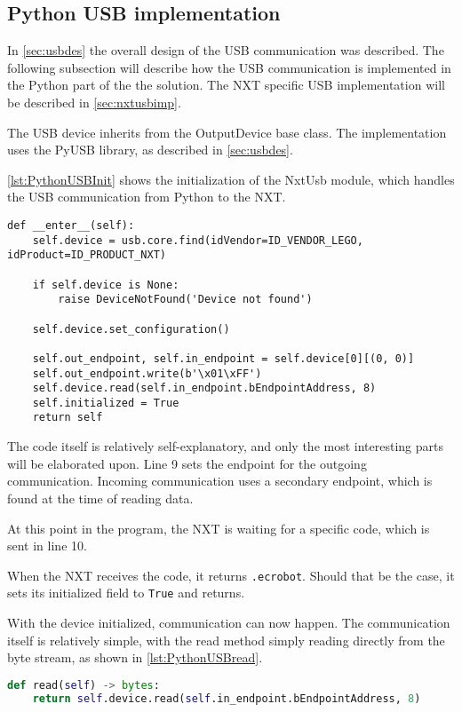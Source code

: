 \subsection{Python USB implementation}\label{sol:subsec:pythonusb}
In \autoref{sec:usbdes} the overall design of the USB communication was described.
The following subsection will describe how the USB communication is implemented in the Python part of the the solution.
The NXT specific USB implementation will be described in \autoref{sec:nxtusbimp}.

The USB device inherits from the OutputDevice base class.
The implementation uses the PyUSB library, as described in \autoref{sec:usbdes}\cite{PyUSB}.

\autoref{lst:PythonUSBInit} shows the initialization of the NxtUsb module, which handles the USB communication from Python to the NXT.
\begin{lstlisting}[label={lst:PythonUSBInit},caption={The initialization of PyUSB{.} Comments removed}]
def __enter__(self):
    self.device = usb.core.find(idVendor=ID_VENDOR_LEGO, idProduct=ID_PRODUCT_NXT)

    if self.device is None:
        raise DeviceNotFound('Device not found')

    self.device.set_configuration()

    self.out_endpoint, self.in_endpoint = self.device[0][(0, 0)]
    self.out_endpoint.write(b'\x01\xFF') 
    self.device.read(self.in_endpoint.bEndpointAddress, 8) 
    self.initialized = True
    return self
\end{lstlisting}

The code itself is relatively self-explanatory, and only the most interesting parts will be elaborated upon.
Line 9 sets the endpoint for the outgoing communication.
Incoming communication uses a secondary endpoint, which is found at the time of reading data.

At this point in the program, the NXT is waiting for a specific code, which is sent in line 10.

When the NXT receives the code, it returns \texttt{{.}ecrobot}.
Should that be the case, it sets its initialized field to \texttt{True} and returns.

With the device initialized, communication can now happen.
The communication itself is relatively simple, with the read method simply reading directly from the byte stream, as shown in \autoref{lst:PythonUSBread}.

\begin{lstlisting}[language=Python,label={lst:PythonUSBread},caption={Reading from the USB port connected to the NXT}]
def read(self) -> bytes:
    return self.device.read(self.in_endpoint.bEndpointAddress, 8)
\end{lstlisting}


